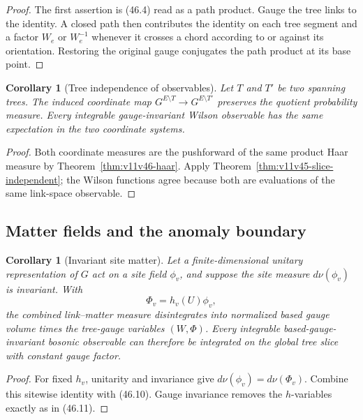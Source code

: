 \documentclass[11pt]{article}
\newtheorem{corollary}[theorem]{Corollary}
\begin{document}
\begin{proof}
The first assertion is (46.4) read as a path product.  Gauge the tree
links to the identity.  A closed path then contributes the identity on
each tree segment and a factor \(W_e\) or \(W_e^{-1}\) whenever it
crosses a chord according to or against its orientation.  Restoring
the original gauge conjugates the path product at its base point.
\end{proof}

\begin{corollary}[Tree independence of observables]
\label{cor:v11v46-tree-independent}
Let \(T\) and \(T'\) be two spanning trees.  The induced coordinate
map \(G^{E\setminus T}\to G^{E\setminus T'}\) preserves the quotient
probability measure.  Every integrable gauge-invariant Wilson
observable has the same expectation in the two coordinate systems.
\end{corollary}

\begin{proof}
Both coordinate measures are the pushforward of the same product Haar
measure by Theorem~\ref{thm:v11v46-haar}.  Apply
Theorem~\ref{thm:v11v45-slice-independent}; the Wilson functions agree
because both are evaluations of the same link-space observable.
\end{proof}

\subsection{Matter fields and the anomaly boundary}

\begin{corollary}[Invariant site matter]
\label{cor:v11v46-matter}
Let a finite-dimensional unitary representation of \(G\) act on a
site field \(\phi_v\), and suppose the site measure \(d\nu(\phi_v)\)
is invariant.  With
\[
                         \Phi_v=h_v(U)\phi_v,                  \tag{46.15}
\]
the combined link--matter measure disintegrates into normalized based
gauge volume times the tree-gauge variables \((W,\Phi)\).
Every integrable based-gauge-invariant bosonic observable can therefore
be integrated on the global tree slice with constant gauge factor.
\end{corollary}

\begin{proof}
For fixed \(h_v\), unitarity and invariance give
\(d\nu(\phi_v)=d\nu(\Phi_v)\).  Combine this sitewise identity with
(46.10).  Gauge invariance removes the \(h\)-variables exactly as in
(46.11).
\end{proof}
\end{document}
